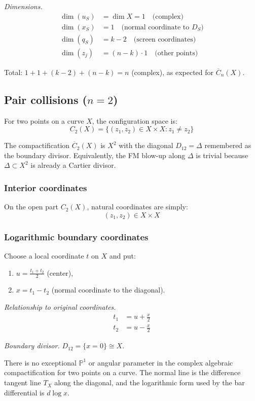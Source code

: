 \begin{convention}
\emph{Dimensions.}
\begin{align*}
\dim(u_S) &= \dim X = 1 \quad \text{(complex)}\\
\dim(x_S) &= 1 \quad \text{(normal coordinate to }D_S)\\
\dim(q_S) &= k-2 \quad \text{(screen coordinates)}\\
\dim(z_j) &= (n-k) \cdot 1 \quad \text{(other points)}
\end{align*}

Total: $1 + 1 + (k-2) + (n-k) = n$ (complex), as expected for $\overline{C}_n(X)$.
\end{convention}

\subsection{\texorpdfstring{Pair collisions ($n=2$)}{Pair collisions (n=2)}}

\begin{example}\label{ex:coords-n2}
For two points on a curve $X$, the configuration space is:
\[C_2(X) = \{(z_1, z_2) \in X \times X : z_1 \neq z_2\}\]

The compactification $\overline{C}_2(X)$ is $X^2$ with the diagonal
$D_{12}=\Delta$ remembered as the boundary divisor. Equivalently, the
FM blow-up along $\Delta$ is trivial because $\Delta\subset X^2$ is
already a Cartier divisor.

\subsubsection{Interior coordinates}

On the open part $C_2(X)$, natural coordinates are simply:
\[(z_1, z_2) \in X \times X\]

\subsubsection{Logarithmic boundary coordinates}

Choose a local coordinate $t$ on $X$ and put:
\begin{enumerate}
\item $u=\frac{t_1+t_2}{2}$ (center),
\item $x=t_1-t_2$ (normal coordinate to the diagonal).
\end{enumerate}

\emph{Relationship to original coordinates.}
\begin{align}
t_1 &= u + \frac{x}{2} \label{eq:blowup-z1}\\
t_2 &= u - \frac{x}{2} \label{eq:blowup-z2}
\end{align}

\emph{Boundary divisor.} $D_{12}=\{x=0\}\cong X$.

There is no exceptional $\mathbb P^1$ or angular parameter in the
complex algebraic compactification for two points on a curve. The
normal line is the difference tangent line $T_X$ along the diagonal,
and the logarithmic form used by the bar differential is $d\log x$.
\end{example}

